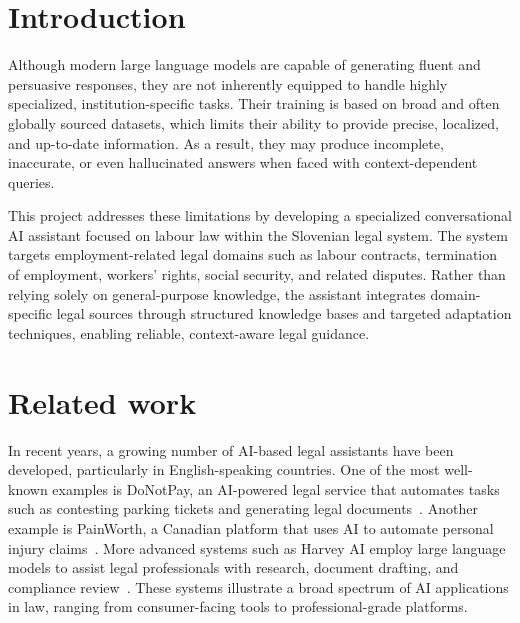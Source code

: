 \documentclass[fleqn,moreauthors,10pt]{ds_report}
\affiliation{\textit{Advisors: Slavko Žitnik}}
\begin{document}
\flushbottom 

\maketitle 

\thispagestyle{empty} 


\section*{Introduction}
Although modern large language models are capable of generating fluent and persuasive responses, they are not inherently equipped to handle highly specialized, institution-specific tasks. Their training is based on broad and often globally sourced datasets, which limits their ability to provide precise, localized, and up-to-date information. As a result, they may produce incomplete, inaccurate, or even hallucinated answers when faced with context-dependent queries.

This project addresses these limitations by developing a specialized conversational AI assistant focused on labour law within the Slovenian legal system. The system targets employment-related legal domains such as labour contracts, termination of employment, workers’ rights, social security, and related disputes. Rather than relying solely on general-purpose knowledge, the assistant integrates domain-specific legal sources through structured knowledge bases and targeted adaptation techniques, enabling reliable, context-aware legal guidance.


\section*{Related work}
In recent years, a growing number of AI-based legal assistants have been developed, particularly in English-speaking countries. One of the most well-known examples is DoNotPay, an AI-powered legal service that automates tasks such as contesting parking tickets and generating legal documents~\cite{donotpay}. Another example is PainWorth, a Canadian platform that uses AI to automate personal injury claims~\cite{painwort}. More advanced systems such as Harvey AI employ large language models to assist legal professionals with research, document drafting, and compliance review~\cite{harveyai}. These systems illustrate a broad spectrum of AI applications in law, ranging from consumer-facing tools to professional-grade platforms.
\end{document}
